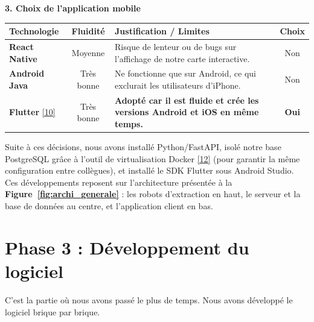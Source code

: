 \vspace{-12pt}
\textbf{3. Choix de l'application mobile}
\vspace{-6pt}
\begin{table}[H]
    \centering
    \footnotesize
    \renewcommand{\arraystretch}{1.2}
    \begin{tabularx}{\textwidth}{|l|c|X|c|}
        \hline
        \rowcolor{headergray}
        \textbf{Technologie} & \textbf{Fluidit\'e} & \textbf{Justification / Limites} & \textbf{Choix} \\ \hline
        \textbf{React Native} & Moyenne & Risque de lenteur ou de bugs sur l'affichage de notre carte interactive. & Non \\ \hline
        \textbf{Android Java} & Tr\`es bonne & Ne fonctionne que sur Android, ce qui exclurait les utilisateurs d'iPhone. & Non \\ \hline
        \textbf{Flutter} \hyperref[ref:flutter]{[10]} & Tr\`es bonne & \textbf{Adopt\'e car il est fluide et cr\'ee les versions Android et iOS en m\^eme temps.} & \textbf{Oui} \\ \hline
    \end{tabularx}
\end{table}
\vspace{-4pt}

Suite \`a ces d\'ecisions, nous avons install\'e Python/FastAPI, isol\'e notre base PostgreSQL gr\^ace \`a l'outil de virtualisation Docker \hyperref[ref:docker]{[12]} (pour garantir la m\^eme configuration entre coll\`egues), et install\'e le SDK Flutter sous Android Studio. Ces d\'eveloppements reposent sur l'architecture pr\'esent\'ee \`a la \textbf{Figure~\ref{fig:archi_generale}} : les robots d'extraction en haut, le serveur et la base de donn\'ees au centre, et l'application client en bas.



\vspace{-4pt}
\section{Phase 3 : D\'eveloppement du logiciel}
\vspace{-2pt}
C'est la partie o\`u nous avons pass\'e le plus de temps. Nous avons d\'evelopp\'e le logiciel brique par brique.
